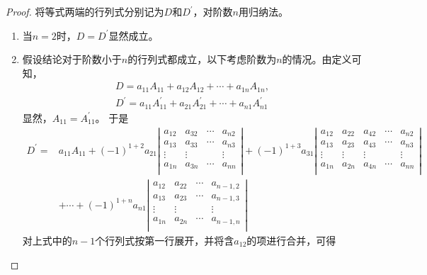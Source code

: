 \begin{proof}
  将等式两端的行列式分别记为$D$和$D^\prime$，对阶数$n$用归纳法。
  \begin{enumerate}
  \item 当$n=2$时，$D=D^\prime$显然成立。 
  \item 假设结论对于阶数小于$n$的行列式都成立，以下考虑阶数为$n$的情况。由定义可知，
    $$
    \begin{array}{c}
      D = a_{11} A_{11}+a_{12}A_{12}+\cdots+a_{1n}A_{1n}, \\[0.1in]
      D^\prime = a_{11} A^\prime_{11}+a_{21}A^\prime_{21}+\cdots+a_{n1}A^\prime_{n1}
    \end{array}
    $$
    显然，$A_{11}=A^\prime_{11}$。
    于是
    $$
    \begin{aligned}
      D^\prime =&
      a_{11} A_{11}+(-1)^{1+2}a_{21}
      \left|
        \begin{array}{cccc}
          a_{12} & a_{32} & \cdots & a_{n2} \\
          a_{13} & a_{33} & \cdots & a_{n3} \\
          \vdots & \vdots & & \vdots \\
          a_{1n} & a_{3n} & \cdots & a_{nn} \\
        \end{array}
      \right|  + (-1)^{1+3}a_{31}
      \left|
        \begin{array}{ccccc}
          a_{12} & a_{22} & a_{42} & \cdots & a_{n2} \\
          a_{13} & a_{23} & a_{43} & \cdots & a_{n3} \\
          \vdots & \vdots & \vdots & & \vdots \\
          a_{1n} & a_{2n} & a_{4n} & \cdots & a_{nn} \\
        \end{array}
      \right|  \\
      & + \cdots + (-1)^{1+n} a_{n1} \left|
        \begin{array}{cccc}
          a_{12} & a_{22} & \cdots & a_{n-1,2} \\
          a_{13} & a_{23} & \cdots & a_{n-1,3} \\
          \vdots & \vdots & & \vdots \\
          a_{1n} & a_{2n} & \cdots & a_{n-1,n} \\
        \end{array}
      \right|
    \end{aligned}
    $$
    对上式中的$n-1$个行列式按第一行展开，并将含$a_{12}$的项进行合并，可得

\end{enumerate}
\end{proof}
